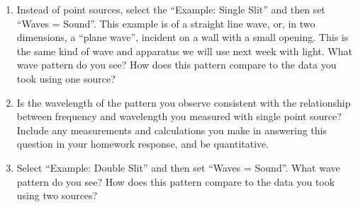 \begin{enumerate}
	\item Instead of point sources, select the ``Example: Single Slit'' and then set ``Waves = Sound''. This example is of a straight line wave, or, in two dimensions, a ``plane wave'', incident on a wall with a small opening. This is the same kind of wave and apparatus we will use next week with light. What wave pattern do you see? How does this pattern compare to the data you took using one source?
	
	\item Is the wavelength of the pattern you observe consistent with the relationship between frequency and wavelength you
	measured with single point source? Include any measurements and calculations you make in answering this question in your homework response, and be quantitative.
	
	\item Select ``Example: Double Slit'' and then set ``Waves = Sound''. What wave pattern do you see? How does this pattern compare to the data you took using two sources?
	
\end{enumerate}
	


	

	
%
%
%
%
%
%	
